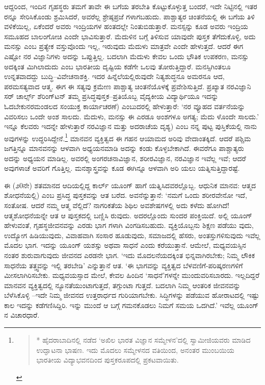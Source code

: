 ಆದ್ದರಿಂದ, ಇಂದಿನ ಗೃಹಸ್ಥರು ತಮಗೆ ತಾವೇ ಈ ಬಗೆಯ ತರಬೇತಿ ಕೊಟ್ಟುಕೊಳ್ಳುತ್ತ ಬಂದರೆ, ಇದೇ ನಿಟ್ಟಿನಲ್ಲಿ ಇತರ ರನ್ನೂ ಸೇರಿಸಿಕೊಂಡು ಶ್ರಮಿಸಿದರೆ, ಅವರೆಲ್ಲ ಶ್ರೇಷ್ಠಪ್ರಜೆ ಗಳಾಗಬಹುದು. ಪಾಶ್ಚಾತ್ಯರ ಚಿಂತನೆಯಲ್ಲಿ ಈ ಬಗೆಯ ತಿಳಿ ವಳಿಕೆಯಿಲ್ಲ, ಏಕೆಂದರೆ ಅವರು ಇಂದ್ರಿಯಗಳ ಹಂತದಲ್ಲೇ ನಿಂತುಬಿಡುತ್ತಾರೆ. ಮನಸ್ಸನ್ನು ಕೂಡ ಅವರು ಇಂದ್ರಿಯ ಸಮೂಹದ ಬಾಲಂಗೋಚಿ ಎಂದೇ ಭಾವಿಸುತ್ತಾರೆ. ಮೆದುಳಿನ ಬಗ್ಗೆ ತಿಳಿಸುವ ಯಾವುದೇ ಪುಸ್ತಕ ತೆಗೆದುಕೊಳ್ಳಿ, ಅದು ಮನಸ್ಸು ಎಂಬ ಪ್ರತ್ಯೇಕ ವಸ್ತುವೊಂದು ಇಲ್ಲ, ಇರುವುದು ಮೆದುಳು ಮಾತ್ರವೇ ಎಂದೇ ಹೇಳುತ್ತದೆ. ಆದರೆ ಈಗ ಎಷ್ಟೋ ನರ ವಿಜ್ಞಾನಿಗಳು ಅದನ್ನು ಒಪ್ಪುತ್ತಿಲ್ಲ. ಬದಲಾಗಿ ಮೆದುಳು ಕೇವಲ ಒಂದು ಭೌತಿಕ ಉಪಕರಣ, ಮನಸ್ಸು ಅದಕ್ಕಿಂತ ಮಿಗಿಲಾದುದು ಎಂಬ ಭಾರತೀಯ ದೃಷ್ಟಿಯ ಕಡೆಗೇ ಒಲವು ತೋರುತ್ತಿದ್ದಾರೆ. ಮನಸ್ಸಿಗಿಂತಲೂ ಉನ್ನತವಾದದ್ದು ಬುದ್ಧಿ–ವಿವೇಚನಾಶಕ್ತಿ. ಇದರ ಹಿನ್ನೆಲೆಯಲ್ಲಿರುವುದೇ ನಿತ್ಯಶುದ್ಧನೂ ಅಮರನೂ ಆದ, ಪರಮಸತ್ಯವಾದ ಆತ್ಮ. ಈಗ ಈ ಸತ್ಯವು ಕ್ರಮೇಣ ಪಾಶ್ಚಾತ್ಯ ಚಿಂತನೆಯೊಳಕ್ಕೆ ಪ್ರವೇಶಿಸುತ್ತಿದೆ. ಪ್ರಖ್ಯಾತ ನರವಿಜ್ಞಾನಿ ಸರ್ ಚಾರ್ಲ್ಸ್ ಶೆರಿಂಗ್​ಟನ್ ತಮ್ಮ ಪ್ರಸಿದ್ಧಪುಸ್ತಕ–ಪ್ರತಿಯೊಬ್ಬ ವೈದ್ಯಕೀಯ ವಿದ್ಯಾರ್ಥಿಯೂ ಇದನ್ನು ಓದಬೇಕುನರಮಂಡಲದ ಸಂಯುಕ್ತ ಕಾರ್ಯಾಚರಣೆ) ಎಂಬುದರಲ್ಲಿ ಹೇಳುತ್ತಾರೆ: ‘ನರ ವ್ಯೂಹದ ವರ್ತನೆಯನ್ನು ವಿವರಿಸಲು ಒಂದೇ ಅಂಶ ಸಾಲದು. ಮೆದುಳು, ಮನಸ್ಸು ಈ ಎರಡೂ ಅಂಶಗಳೂ ಅಗತ್ಯ; ಮೆದು ಳೊಂದೇ ಸಾಲದು.’ ಇನ್ನೂ ಕೆಲವರು ಇದನ್ನೇ ಹೇಳುತ್ತಾರೆ ನರವಿಜ್ಞಾನ ಮತ್ತು ಅದರಾಚೆಯ ದೃಶ್ಯ) ಎಂಬ ನನ್ನ ಪುಟ್ಟ ಪುಸ್ತಿಕೆಯಲ್ಲಿ ನಾನು ಅವುಗಳನ್ನು ಉದ್ಧರಿಸಿದ್ದೇನೆ.\footnote{
\begin{verse}
* ಹೈದರಾಬಾದಿನಲ್ಲಿ ನಡೆದ ‘ಅಖಿಲ ಭಾರತ ವಿಜ್ಞಾನ ಸಮ್ಮೇಳನ’ದಲ್ಲಿ ಸ್ವಾಮೀಜಿಯವರು ಮಾಡಿದ ಉದ್ಘಾಟನಾ ಭಾಷಣ. ಇದು ಮೊದಲು ಸಮ್ಮೇಳನದ ವತಿಯಿಂದ, ಅನಂತರ ಮುಂಬಯಿಯ ಭಾರತೀಯ ವಿದ್ಯಾಭವನದಿಂದ ಪುಸ್ತಕರೂಪದಲ್ಲಿ ಪ್ರಕಟವಾಯಿತು.
\end{verse}} ಮಾನವನ ವ್ಯಕ್ತಿತ್ವದ ಈ ಗಹನ ಆಯಾಮದ ಅರಿವು ವೇದಾಂತಕ್ಕಿದೆ. ಆದರೆ ಪಶ್ಚಿಮ ಜಗತ್ತಿನ್ನೂ ಮಾನವನನ್ನು ಆಳವಾಗಿ ಅಧ್ಯಯನಮಾಡಿ ಅದನ್ನು ಕಂಡು ಕೊಳ್ಳಬೇಕಾಗಿದೆ. ಈವರೆಗೂ ಪಾಶ್ಚಾತ್ಯರು ಅದನ್ನು ಅಧ್ಯಯನ ಮಾಡಿಲ್ಲ. ಅವರಲ್ಲಿ ಅಂಗರಚನಾವಿಜ್ಞಾನ, ಶರೀರವಿಜ್ಞಾನ, ನರವಿಜ್ಞಾನ ಇವೆಲ್ಲ ಇವೆ; ಆದರೆ ಅವುಗಳಾಚೆ ಅವರಿಗೆ ಗೊತ್ತಿಲ್ಲ. ಮನಶ್ಶಾಸ್ತ್ರವನ್ನು ಕೂಡ ಈಗಿನ್ನೂ ಆಳವಾಗಿ ಅರಿ ಯಲು ಯತ್ನಿಸುತ್ತಿದ್ದಾರಷ್ಟೆ. 

ಈ (೨0ನೇ) ಶತಮಾನದ ಆದಿಯಲ್ಲಿದ್ದ ಕಾರ್ಲ್ ಯೂಂಗ್ ಹಾಗೆ ಯತ್ನಿಸಿದವರಲ್ಲೊಬ್ಬ. ಆಧುನಿಕ ಮಾನವ: ಆತ್ಮದ ಶೋಧನೆಯಲ್ಲಿ) ಎಂಬ ಪ್ರಸಿದ್ಧ ಪುಸ್ತಕವನ್ನು ಆತ ಬರೆದ. ಅವನೆನ್ನುತ್ತಾನೆ: ‘ನಮಗೆ ಒಂದು ಶರೀರವೇನೋ ಇದೆ, ಸಂತೋಷ. ಆದರೆ ನಮ್ಮ ಆತ್ಮ ವೆಲ್ಲಿದೆ? ನಾಗರಿಕತೆಯ ಶಿಥಿಲ ಅವಶೇಷಗಳಲ್ಲಿ ಅದು ಕಳೆದು ಹೋಗಿದೆ! ಆತ್ಮಶೋಧನೆಯನ್ನೇ ಆತ ಆ ಪುಸ್ತಕದಲ್ಲಿ ಬಣ್ಣಿಸಿ ರುವುದು. ಅದರಲ್ಲೊಂದು ಸುಂದರ ಪಂಕ್ತಿಯಿದೆ. ಅಲ್ಲಿ ಯೂಂಗ್ ಹೇಳುವಂತೆ, ಗೃಹಸ್ಥಜೀವನವನ್ನು ಎರಡು ಭಾಗ ಗಳಾಗಿ ವಿಂಗಡಿಸಬಹುದು. ವ್ಯಕ್ತಿಯೊಬ್ಬನು ಶಿಕ್ಷಣ ಪಡೆಯು ವುದು, ಉದ್ಯೋಗ ಹಿಡಿಯುವುದು, ವಿವಾಹವಾಗಿ ಸಂಸಾರ ಹೂಡುವುದು, ಸಮಾಜದಲ್ಲಿ ಹೆಸರು, ಅಂತಸ್ತುಗಳಿಸುವುದು ಇವೆಲ್ಲ ಮೊದಲ ಭಾಗ. ಇದನ್ನು ಯೂಂಗ್ ಯಶಸ್ಸು ಅಥವಾ ಸಾಧನೆ  ಎಂದು ಕರೆಯುತ್ತಾನೆ. ಆಮೇಲೆ, ಮಧ್ಯವಯಸ್ಸಿನ ನಂತರ ಶುರುವಾಗುವುದು ಜೀವನದ ಎರಡನೇ ಭಾಗ. ‘ಇದು ಮೊದಲನೆಯದಕ್ಕಿಂತ ಭಿನ್ನವಾಗಿರಬೇಕು; ನಿಮ್ಮ ಲೌಕಿಕ ಸಾಧನೆಯ ತತ್ತ್ವವನ್ನು ಇಲ್ಲಿ ತರಬೇಡಿ’ ಎನ್ನುತ್ತಾನೆ ಆತ. ‘ಈ ಭಾಗವನ್ನು ವ್ಯಕ್ತಿತ್ವದ ಬೆಳವಣಿಗೆ-ಪರಿಷ್ಕರಣಗಳಿಗೆ ಮೀಸಲಾಗಿರಿಸಬೇಕು. ಮಧ್ಯವಯಸ್ಸಾದ ಮೇಲೆ, ಕೇವಲ ಹಿಂದಿನ ‘ಸಾಧನೆ’ಗಳನ್ನೇ ಮುಂದುವರಿಸಬಾರದು. ಇಲ್ಲದಿದ್ದರೆ ಮಾನವನ ವ್ಯಕ್ತಿತ್ವದಲ್ಲಿ ನ್ಯೂನತೆಯುಂಟಾಗುತ್ತದೆ, ತಗ್ಗುಂಟಾ ಗುತ್ತದೆ. ಬದಲಾಗಿ ನಿಮ್ಮ ಆಂತರಿಕ ಜೀವನವನ್ನು ಬೆಳೆಸಿಕೊಳ್ಳಿ –ಇದೇ ನಿಮ್ಮ ಜೀವನದ ಉತ್ತರಾರ್ಧದ ಗುರಿಯಾಗಬೇಕು. ಸಿದ್ಧಿಗಳನ್ನು ಪಡೆಯುವ ಹೋರಾಟದಲ್ಲಿ ಇಷ್ಟು ಕಾಲ ಇದನ್ನು ಕಡೆಗಣಿಸಿದ್ದಿರಿ. ಇನ್ನು ಮುಂದೆ ಆ ಬಗ್ಗೆ ಗಮನಕೊಡಲು ನಿಮಗೆ ಸಮಯ ಒದಗಿದೆ.’ ಇವೆಲ್ಲ ಯೂಂಗ್​ನ ವಿಚಾರಧಾರೆ.

